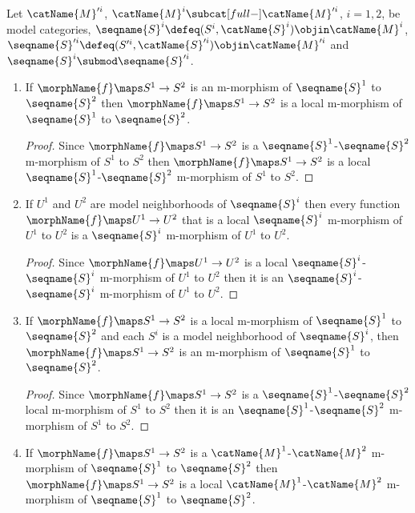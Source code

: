 \documentclass{article}
\begin{document}
\begin{corollary}
\label{cor:modMmorph}
Let $\catName{M}'^i$, $\catName{M}^i \subcat[full-] \catName{M}'^i$,
$i=1,2$, be model categories,
$\seqname{S}^i \defeq (S^i, \catName{S}^i) \objin \catName{M}^i$,
$\seqname{S}'^i \defeq (S'^i, \catName{S}'^i) \objin \catName{M}'^i$
and $\seqname{S}^i \submod \seqname{S}'^i$.

\begin{enumerate}
\item
\label{M-morph:morphislocal}
If $\morphName{f} \maps S^1 \to S^2$ is an m-morphism of
$\seqname{S}^1$ to $\seqname{S}^2$ then $\morphName{f} \maps S^1 \to S^2$
is a local m-morphism of $\seqname{S}^1$ to $\seqname{S}^2$.

\begin{proof}
Since $\morphName{f} \maps S^1 \to S^2$ is a
$\seqname{S}^1$-$\seqname{S}^2$ m-morphism of $S^1$ to $S^2$ then
$\morphName{f} \maps S^1 \to S^2$ is a local
$\seqname{S}^1$-$\seqname{S}^2$ m-morphism of $S^1$ to $S^2$.
\end{proof}

\item
\label{M-morph:sublocalismorph}
If $U^1$ and $U^2$ are model neighborhoods of $\seqname{S}^i$ then every
function $\morphName{f} \maps U^1 \to U^2$ that is a local
$\seqname{S}^i$ m-morphism of $U^1$ to $U^2$ is a $\seqname{S}^i$
m-morphism of $U^1$ to $U^2$.

\begin{proof}
Since $\morphName{f} \maps U^1 \to U^2$ is a local
$\seqname{S}^i$-$\seqname{S}^i$ m-morphism of $U^1$ to $U^2$ then it is
an $\seqname{S}^i$-$\seqname{S}^i$ m-morphism of $U^1$ to $U^2$.
\end{proof}

\item
\label{M-morph:localismorph}
If $\morphName{f} \maps S^1 \to S^2$ is a local m-morphism of
$\seqname{S}^1$ to $\seqname{S}^2$ and each $S^i$ is a model
neighborhood of $\seqname{S}^i$, then $\morphName{f} \maps S^1 \to S^2$
is an m-morphism of $\seqname{S}^1$ to $\seqname{S}^2$.

\begin{proof}
Since $\morphName{f} \maps S^1 \to S^2$ is a
$\seqname{S}^1$-$\seqname{S}^2$ local m-morphism of $S^1$ to $S^2$ then
it is an $\seqname{S}^1$-$\seqname{S}^2$ m-morphism of $S^1$ to
$S^2$.
\end{proof}

\item
\label{M-morph:catmorphislocal}
If $\morphName{f} \maps S^1 \to S^2$ is a $\catName{M}^1$-$\catName{M}^2$
m-morphism of $\seqname{S}^1$ to $\seqname{S}^2$ then
$\morphName{f} \maps S^1 \to S^2$ is a local
$\catName{M}^1$-$\catName{M}^2$ m-morphism of $\seqname{S}^1$ to
$\seqname{S}^2$.


\end{enumerate}
\end{corollary}
\end{document}
